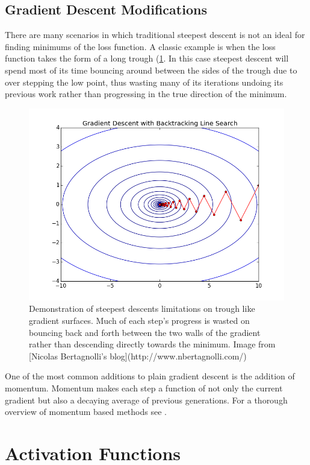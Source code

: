 \documentclass[]{book}
\theoremstyle{definition}
\theoremstyle{definition}
\theoremstyle{definition}
\theoremstyle{remark}
\begin{document}
\subsection{Gradient Descent
Modifications}\label{gradient-descent-modifications}

There are many scenarios in which traditional steepest descent is not an
ideal for finding minimums of the loss function. A classic example is
when the loss function takes the form of a long trough
(\ref{fig:badloss}. In this case steepest descent will spend most of its
time bouncing around between the sides of the trough due to over
stepping the low point, thus wasting many of its iterations undoing its
previous work rather than progressing in the true direction of the
minimum.

\begin{figure}

{\centering \includegraphics[width=0.6\linewidth]{figures/gradient_problems} 

}

\caption{Demonstration of steepest descents limitations on trough like gradient surfaces. Much of each step's progress is wasted on bouncing back and forth between the two walls of the gradient rather than descending directly towards the minimum. Image from [Nicolas Bertagnolli's blog](http://www.nbertagnolli.com/)}\label{fig:badloss}
\end{figure}

One of the most common additions to plain gradient descent is the
addition of momentum. Momentum makes each step a function of not only
the current gradient but also a decaying average of previous
generations. For a thorough overview of momentum based methods see
\citet{momentum}.

\section{Activation Functions}\label{activation-functions}
\end{document}
